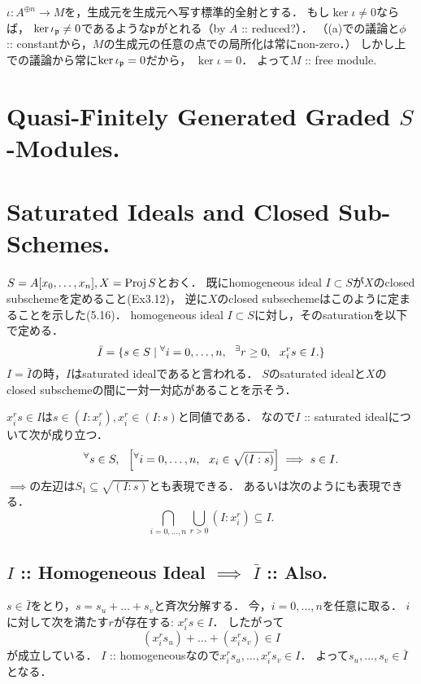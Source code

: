 \documentclass[a4paper]{jsarticle}
\begin{document}
    $\iota: A^{\oplus n} \to M$を，生成元を生成元へ写す標準的全射とする．
    もし$\ker \iota \neq 0$ならば，
    $\ker \iota_{\mathfrak{p}} \neq 0$であるような$\mathfrak{p}$がとれる（by $A$ :: reduced?）．
    （(a)での議論と$\phi$ :: constantから，$M$の生成元の任意の点での局所化は常にnon-zero．）
    しかし上での議論から常に$\ker \iota_{\mathfrak{p}}=0$だから，
    $\ker \iota=0$．
    よって$M$ :: free module.

\section{Quasi-Finitely Generated Graded $S$-Modules.} %

\section{Saturated Ideals and Closed Sub-Schemes.} %
    $S=A[x_0,\dots,x_n], X=\operatorname{Proj} S$とおく．
    既にhomogeneous ideal $I \subset S$が$X$のclosed subschemeを定めること(Ex3.12)，
    逆に$X$のclosed subsechemeはこのように定まることを示した(5.16)．
    homogeneous ideal $I \subset S$に対し，そのsaturationを以下で定める．
    \[ \bar{I}=\{s \in S \mid {}^{\forall} i=0,\dots,n,~~ {}^{\exists} r \geq 0,~~ x_i^r s \in I. \} \]
    $I=\bar{I}$の時，$I$はsaturated idealであると言われる．
    $S$のsaturated idealと$X$のclosed subschemeの間に一対一対応があることを示そう．

    \begin{Remark}
        $x_i^r s \in I$は$s \in (I:x_i^r), x_i^r \in (I:s)$と同値である．
        なので$I$ :: saturated idealについて次が成り立つ．
        \[ {}^{\forall} s \in S,~~ \left[{}^{\forall} i=0,\dots,n,~~ x_i \in \sqrt{(I:s)}\right]  \implies s \in I. \]
        $\implies$の左辺は$S_1 \subseteq \sqrt{(I:s)}$とも表現できる．
        あるいは次のようにも表現できる．
        \[ \bigcap_{i=0,\dots,n} \bigcup_{r>0} (I:x_i^r) \subseteq I. \]
    \end{Remark}

    \subsection{$I$ :: Homogeneous Ideal $\implies$ $\bar{I}$ :: Also.}
    $s \in \bar{I}$をとり，$s=s_u+\dots+s_v$と斉次分解する．
    今，$i=0,\dots,n$を任意に取る．
    $i$に対して次を満たす$r$が存在する: $x_i^r s \in I$．
    したがって
    \[ (x_i^r s_u)+\dots+(x_i^r s_v) \in I \]
    が成立している．
    $I$ :: homogeneousなので$x_i^r s_u,\dots,x_i^r s_v \in I$．
    よって$s_u,\dots,s_v \in \bar{I}$となる．
\end{document}
